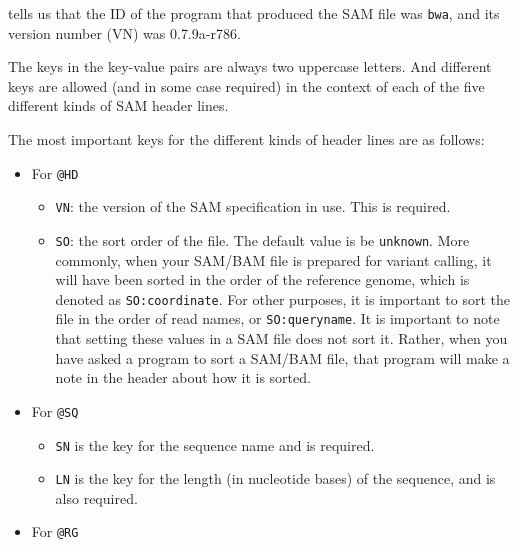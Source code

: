 \documentclass[]{krantz}
\providecommand{\tightlist}{%
  \setlength{\itemsep}{0pt}\setlength{\parskip}{0pt}}
\begin{document}
tells us that the ID of the program that produced the SAM file was \texttt{bwa}, and
its version number (VN) was 0.7.9a-r786.

The keys in the key-value pairs are always two uppercase letters. And different keys
are allowed (and in some case required) in the context of each of the five different
kinds of SAM header lines.

The most important keys for the different kinds of header lines are as follows:

\begin{itemize}
\tightlist
\item
  For \texttt{@HD}

  \begin{itemize}
  \tightlist
  \item
    \texttt{VN}: the version of the SAM specification in use. This is required.
  \item
    \texttt{SO}: the sort order of the file. The default value is be \texttt{unknown}.
    More commonly, when your SAM/BAM file is prepared for variant calling, it will have been sorted in the
    order of the reference genome, which is denoted as \texttt{SO:coordinate}. For other purposes, it is important
    to sort the file in the order of read names, or \texttt{SO:queryname}. It is important to note that
    setting these values in a SAM file does not sort it. Rather, when you have asked a program to sort
    a SAM/BAM file, that program will make a note in the header about how it is sorted.
  \end{itemize}
\item
  For \texttt{@SQ}

  \begin{itemize}
  \tightlist
  \item
    \texttt{SN} is the key for the sequence name and is required.\\
  \item
    \texttt{LN} is the key for the length (in nucleotide bases) of the sequence, and is also required.
  \end{itemize}
\item
  For \texttt{@RG}


\end{itemize}
\end{document}
